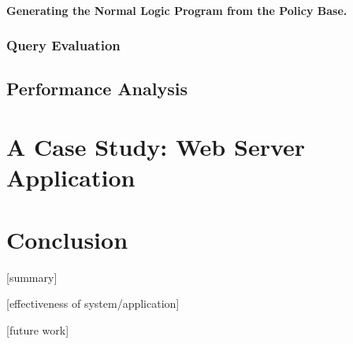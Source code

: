\documentclass[10pt, twocolumn]{article}
\begin{document}
        \paragraph{Generating the Normal Logic Program from the Policy Base.}

      \subsubsection{Query Evaluation}

    \subsection{Performance Analysis}

  \section{A Case Study: Web Server Application}

  \section{Conclusion}

    [summary]

    [effectiveness of system/application]

    [future work]
\end{document}
